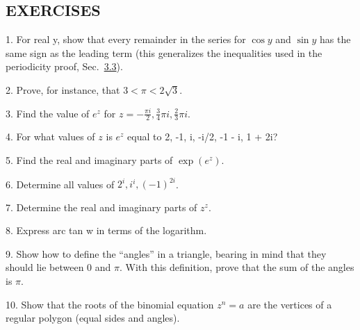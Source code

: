 \subsection*{EXERCISES}
1. For real y, show that every remainder in the series for $\cos y$ and $\sin y$ has the same sign as the leading term (this generalizes the inequalities used in the periodicity proof, Sec.~\hyperref[sec:2.3.3]{3.3}).

2. Prove, for instance, that $3 < \pi < 2\sqrt{3}$.

3. Find the value of $e^z$ for $z = -\frac{\pi i}{2}, \frac{3}{4} \pi i, \frac{2}{3} \pi i$.

4. For what values of $z$ is $e^z$ equal to 2, -1, i, -i/2, -1 - i, 1 + 2i?

5. Find the real and imaginary parts of $\exp (e^z)$.

6. Determine all values of $2^{i}, i^{i}, (-1)^{2i}$.

7. Determine the real and imaginary parts of $z^{z}$.

8. Express arc tan w in terms of the logarithm.

9. Show how to define the “angles” in a triangle, bearing in mind that they should lie between 0 and $\pi$. With this definition, prove that the sum of the angles is $\pi$.

10. Show that the roots of the binomial equation $z^{n} = a$ are the vertices of a regular polygon (equal sides and angles).


